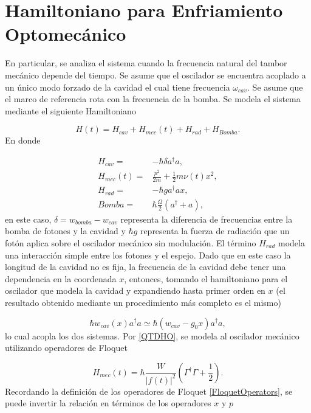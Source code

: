 \documentclass[a4paper,10pt]{report}
\begin{document}
\section{Hamiltoniano para Enfriamiento Optomecánico}

En particular, se analiza el sistema cuando la frecuencia natural del tambor mecánico depende del tiempo. Se asume que el oscilador se encuentra acoplado a un único modo forzado de la cavidad el cual tiene frecuencia $\omega_{cav}$. Se asume que el marco de referencia rota con la frecuencia de la bomba. Se modela el sistema mediante el siguiente Hamiltoniano\cite{BarberisLC}

\begin{equation}
H(t) = H_{cav} + H_{mec}(t) + H_{rad} + H_{Bomba}.
\end{equation} En donde

\begin{align}
H_{cav} =& -\hbar \delta a^\dagger a,\\
H_{mec}(t) =& \frac{p^2}{2m} + \frac{1}{2}m \nu (t) x^2,\\
H_{rad} =& -\hbar g a^\dagger a x,\\
Bomba =& \hbar\frac{\Omega}{2}(a^\dagger + a),
\end{align} en este caso, $\delta = w_{bomba} - w_{cav}$ representa la diferencia de frecuencias entre la bomba de fotones y la cavidad y $\hbar g$ representa la fuerza de radiación que un fotón aplica sobre el oscilador mecánico sin modulación. El término $H_{rad}$ modela una interacción simple entre los fotones y el espejo. Dado que en este caso la longitud de la cavidad no es fija, la frecuencia de la cavidad debe tener una dependencia en la coordenada $x$, entonces, tomando el hamiltoniano para el oscilador que modela la cavidad y expandiendo hasta primer orden en $x$ (el resultado obtenido mediante un procedimiento más completo es el mismo)\cite{KippenberCO} 

\begin{equation}
\hbar w_{cav}(x) a^\dagger a \simeq \hbar(w_{cav}-g_0x)a^\dagger a,
\end{equation}lo cual acopla los dos sistemas. Por \eqref{QTDHO}, se modela al oscilador mecánico utilizando operadores de Floquet

\begin{equation}
H_{mec}(t) = \hbar\frac{W}{|f(t)|^2}(\Gamma^\dagger \Gamma + \frac{1}{2}).
\end{equation} Recordando la definición de los operadores de Floquet \eqref{FloquetOperators}, se puede invertir la relación en términos de los operadores $x$ y $p$
\end{document}
